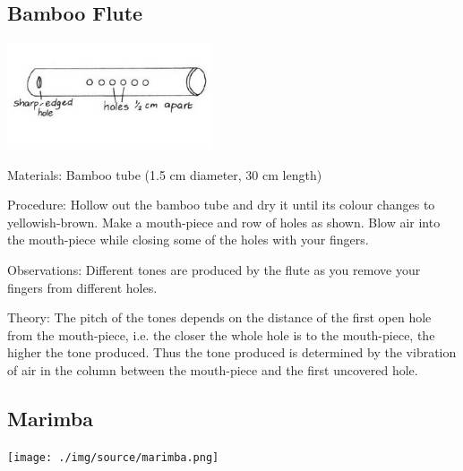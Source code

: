 \begin{multicols}{2}
\subsection{Bamboo Flute}

\begin{center}
\includegraphics[width=0.45\textwidth]{./img/vso/bamboo-flute.jpg}
\end{center}

\begin{description*}
\item[Materials:]{Bamboo tube (1.5 cm diameter, 30 cm length)}
\item[Procedure:]{Hollow out the bamboo tube and dry it until its colour changes to yellowish-brown. Make a mouth-piece and row of holes as shown. Blow air into the mouth-piece while closing some of the holes with your fingers.}
\item[Observations:]{Different tones are produced by the flute as you remove your fingers from different holes.}
\item[Theory:]{The pitch of the tones depends on the distance of the first open hole from the mouth-piece, i.e. the closer the whole hole is to the mouth-piece, the higher the tone produced. Thus the tone produced is determined by the vibration of air in the column between the mouth-piece and the first uncovered hole.}
\end{description*}

\columnbreak

\subsection{Marimba}

\begin{center}
\texttt{[image: ./img/source/marimba.png]}
\end{center}


\end{multicols}
